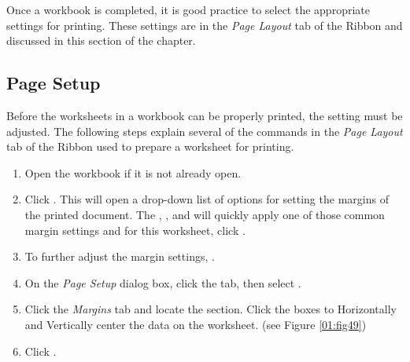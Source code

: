 Once a workbook is completed, it is good practice to select the appropriate settings for printing. These settings are in the \textit{Page Layout} tab of the Ribbon and discussed in this section of the chapter.

\subsection{Page Setup}

Before the worksheets in a workbook can be properly printed, the setting must be adjusted. The following steps explain several of the commands in the \textit{Page Layout} tab of the Ribbon used to prepare a worksheet for printing.

\begin{enumerate}
	\item Open the  workbook if it is not already open.
	\item Click . This will open a drop-down list of options for setting the margins of the printed document. The , , and  will quickly apply one of those common margin settings and for this worksheet, click .
	\item To further adjust the margin settings, .
	\item On the \textit{Page Setup} dialog box, click the  tab, then select .
	\item Click the \textit{Margins} tab and locate the  section. Click the boxes to Horizontally and Vertically center the data on the worksheet. (see Figure \ref{01:fig49})
	\item Click .
\end{enumerate}

